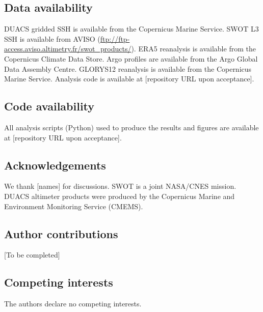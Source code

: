 \documentclass[11pt]{article}
\begin{document}
\subsection{Data availability}

DUACS gridded SSH is available from the Copernicus Marine Service. SWOT L3 SSH is available from AVISO (\url{ftp://ftp-access.aviso.altimetry.fr/swot_products/}). ERA5 reanalysis is available from the Copernicus Climate Data Store. Argo profiles are available from the Argo Global Data Assembly Centre. GLORYS12 reanalysis is available from the Copernicus Marine Service. Analysis code is available at [repository URL upon acceptance].

\subsection{Code availability}

All analysis scripts (Python) used to produce the results and figures are available at [repository URL upon acceptance].


\subsection*{Acknowledgements}
We thank [names] for discussions. SWOT is a joint NASA/CNES mission. DUACS altimeter products were produced by the Copernicus Marine and Environment Monitoring Service (CMEMS).

\subsection*{Author contributions}
[To be completed]

\subsection*{Competing interests}
The authors declare no competing interests.



\end{document}

